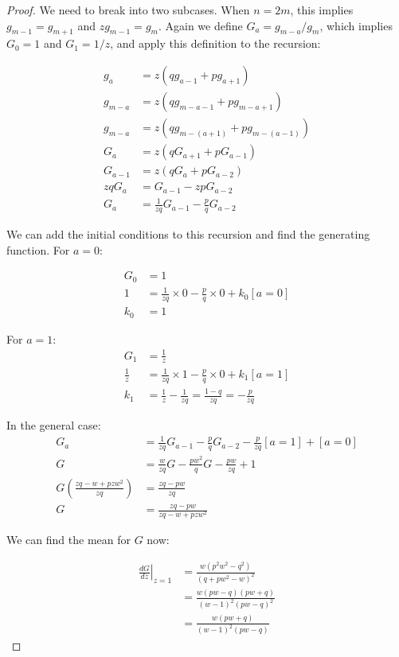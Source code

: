 \documentclass[10pt]{book}
\begin{document}
\begin{proof}
We need to break into two subcases. When $n=2m$, this implies $g_{m-1}=g_{m+1}$ and $z g_{m-1}=g_m$. Again we define $G_a=g_{m-a}/g_m$, which implies $G_0=1$ and $G_1=1/z$, and apply this definition to the recursion:

\begin{align*}
  g_a &= z(qg_{a-1}+pg_{a+1}) \\
  g_{m-a} &= z(qg_{m-a-1}+pg_{m-a+1}) \\
  g_{m-a} &= z(qg_{m-(a+1)}+pg_{m-(a-1)}) \\
  G_a &= z(qG_{a+1}+pG_{a-1}) \\
  G_{a-1} &= z(qG_a+pG_{a-2}) \\
  zqG_a &= G_{a-1}-zpG_{a-2} \\
  G_a &= \frac{1}{zq}G_{a-1}-\frac{p}{q}G_{a-2}
\end{align*}

We can add the initial conditions to this recursion and find the generating function. For $a=0$:

\begin{align*}
  G_0 &= 1 \\
  1 &= \frac{1}{zq}\times 0-\frac{p}{q}\times 0 +k_0[a=0] \\
  k_0 &= 1
\end{align*}

For $a=1$:
\begin{align*}
  G_1 &= \frac{1}{z}\\
  \frac{1}{z} &= \frac{1}{zq}\times 1-\frac{p}{q}\times 0 +k_1[a=1] \\
  k_1 &= \frac{1}{z}-\frac{1}{zq} = \frac{1-q}{zq}=-\frac{p}{zq} 
\end{align*}

In the general case:
\begin{align*}
  G_a &= \frac{1}{zq}G_{a-1}-\frac{p}{q}G_{a-2} -\frac{p}{zq}[a=1]+[a=0] \\
  G &= \frac{w}{zq}G-\frac{pw^2}{q}G-\frac{pw}{zq}+1 \\
  G\left(\frac{zq-w+pzw^2}{zq}\right) &= \frac{zq-pw}{zq} \\
  G &= \frac{zq-pw}{zq-w+pzw^2}
\end{align*}

We can find the mean for $G$ now:

\begin{align*}
  \left.\frac{dG}{dz}\right\rvert_{z=1}  
  &= \frac{w(p^2w^2-q^2)}{(q+pw^2-w)^2} \\
  &= \frac{w(pw-q)(pw+q)}{(w-1)^2(pw-q)^2}\\
  &= \frac{w(pw+q)}{(w-1)^2(pw-q)}
\end{align*}


\end{proof}
\end{document}
